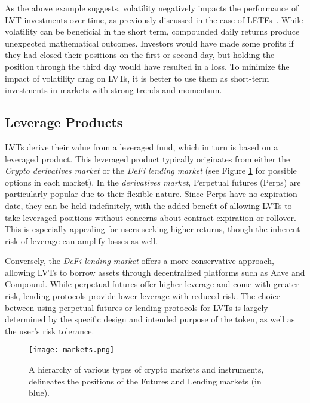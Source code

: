 As the above example suggests, volatility negatively impacts the performance of LVT investments over time, as previously discussed in the case of LETFs~\cite{giese2010performance, trainor2011daily}. While volatility can be beneficial in the short term, compounded daily returns produce unexpected mathematical outcomes. Investors would have made some profits if they had closed their positions on the first or second day, but holding the position through the third day would have resulted in a loss. To minimize the impact of volatility drag on LVTs, it is better to use them as short-term investments in markets with strong trends and momentum.


\subsection{Leverage Products}
LVTs derive their value from a leveraged fund, which in turn is based on a leveraged product. This leveraged product typically originates from either the \textit{Crypto derivatives market} or the \textit{DeFi lending market} (see Figure \ref{fig:markets} for possible options in each market). In the \textit{derivatives market}, Perpetual futures (Perps) are particularly popular due to their flexible nature. Since Perps have no expiration date, they can be held indefinitely, with the added benefit of allowing LVTs to take leveraged positions without concerns about contract expiration or rollover. This is especially appealing for users seeking higher returns, though the inherent risk of leverage can amplify losses as well. 

Conversely, the \textit{DeFi lending market} offers a more conservative approach, allowing LVTs to borrow assets through decentralized platforms such as Aave and Compound. While perpetual futures offer higher leverage and come with greater risk, lending protocols provide lower leverage with reduced risk. The choice between using perpetual futures or lending protocols for LVTs is largely determined by the specific design and intended purpose of the token, as well as the user’s risk tolerance.

\begin{figure}[t]
	\texttt{[image: markets.png]}
	\caption{A hierarchy of various types of crypto markets and instruments, delineates the positions of the Futures and Lending markets (in blue).}
	\label{fig:markets}
\end{figure}

